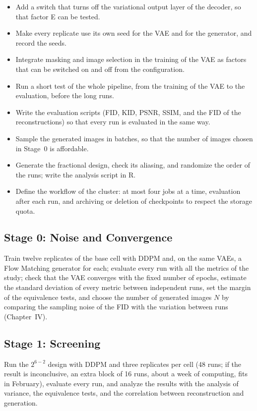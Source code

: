 \begin{itemize}
  \item Add a switch that turns off the variational output layer of the decoder, so that factor E can be tested.
  \item Make every replicate use its own seed for the VAE and for the generator, and record the seeds.
  \item Integrate masking and image selection in the training of the VAE as factors that can be switched on and off from the configuration.
  \item Run a short test of the whole pipeline, from the training of the VAE to the evaluation, before the long runs.
  \item Write the evaluation scripts (FID, KID, PSNR, SSIM, and the FID of the reconstructions) so that every run is evaluated in the same way.
  \item Sample the generated images in batches, so that the number of images chosen in Stage~0 is affordable.
  \item Generate the fractional design, check its aliasing, and randomize the order of the runs; write the analysis script in R.
  \item Define the workflow of the cluster: at most four jobs at a time, evaluation after each run, and archiving or deletion of checkpoints to respect the storage quota.
\end{itemize}

\subsection{Stage 0: Noise and Convergence}

Train twelve replicates of the base cell with DDPM and, on the same VAEs, a Flow Matching generator for each; evaluate every run with all the metrics of the study; check that the VAE converges with the fixed number of epochs, estimate the standard deviation of every metric between independent runs, set the margin of the equivalence tests, and choose the number of generated images $N$ by comparing the sampling noise of the FID with the variation between runs (Chapter~IV).

\subsection{Stage 1: Screening}

Run the $2^{6-2}$ design with DDPM and three replicates per cell (48 runs; if the result is inconclusive, an extra block of 16 runs, about a week of computing, fits in February), evaluate every run, and analyze the results with the analysis of variance, the equivalence tests, and the correlation between reconstruction and generation.

